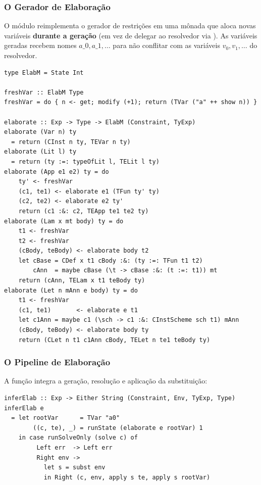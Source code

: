   \subsubsection{O Gerador de Elaboração}

  O módulo  reimplementa o gerador
  de restrições em uma mônada  que
  aloca novas variáveis \textbf{durante a geração} (em vez de delegar
  ao resolvedor via ). As variáveis
  geradas recebem nomes \(a\_0, a\_1,
  \ldots\) para não conflitar com as variáveis \(v_0, v_1,
  \ldots\) do resolvedor.

\begin{verbatim}
type ElabM = State Int

freshVar :: ElabM Type
freshVar = do { n <- get; modify (+1); return (TVar ("a" ++ show n)) }

elaborate :: Exp -> Type -> ElabM (Constraint, TyExp)
elaborate (Var n) ty
  = return (CInst n ty, TEVar n ty)
elaborate (Lit l) ty
  = return (ty :=: typeOfLit l, TELit l ty)
elaborate (App e1 e2) ty = do
    ty' <- freshVar
    (c1, te1) <- elaborate e1 (TFun ty' ty)
    (c2, te2) <- elaborate e2 ty'
    return (c1 :&: c2, TEApp te1 te2 ty)
elaborate (Lam x mt body) ty = do
    t1 <- freshVar
    t2 <- freshVar
    (cBody, teBody) <- elaborate body t2
    let cBase = CDef x t1 cBody :&: (ty :=: TFun t1 t2)
        cAnn  = maybe cBase (\t -> cBase :&: (t :=: t1)) mt
    return (cAnn, TELam x t1 teBody ty)
elaborate (Let n mAnn e body) ty = do
    t1 <- freshVar
    (c1, te1)       <- elaborate e t1
    let c1Ann = maybe c1 (\sch -> c1 :&: CInstScheme sch t1) mAnn
    (cBody, teBody) <- elaborate body ty
    return (CLet n t1 c1Ann cBody, TELet n te1 teBody ty)
\end{verbatim}

  \subsubsection{O Pipeline de Elaboração}

  A função  integra a
  geração, resolução e aplicação da substituição:

\begin{verbatim}
inferElab :: Exp -> Either String (Constraint, Env, TyExp, Type)
inferElab e
  = let rootVar      = TVar "a0"
        ((c, te), _) = runState (elaborate e rootVar) 1
    in case runSolveOnly (solve c) of
         Left err  -> Left err
         Right env ->
           let s = subst env
           in Right (c, env, apply s te, apply s rootVar)
\end{verbatim}


